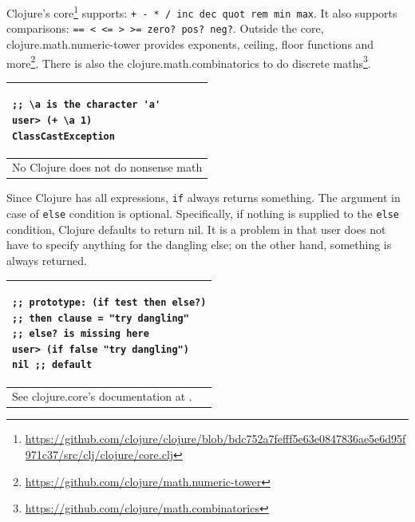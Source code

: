 \documentclass[12pt]{article}
\begin{document}

Clojure's core\footnote{\url{https://github.com/clojure/clojure/blob/bdc752a7fefff5e63e0847836ae5e6d95f971c37/src/clj/clojure/core.clj}} supports: \texttt{+ - * / inc dec quot rem min max}. It also supports comparisons: \texttt{== < <= > >= zero? pos? neg?}. Outside the core, clojure.math.numeric-tower provides exponents, ceiling, floor functions and more\footnote{\url{https://github.com/clojure/math.numeric-tower}}. There is also the clojure.math.combinatorics to do discrete maths\footnote{\url{https://github.com/clojure/math.combinatorics}}.


\begin{tabular}{|p{}|}
\hline
\begin{verbatim}
;; \a is the character 'a'
user> (+ \a 1)
ClassCastException 
\end{verbatim}
\\
\hline
No Clojure does not do nonsense math
\\
\hline
\end{tabular}


Since Clojure has all expressions, \texttt{if} always returns something. The argument in case of \texttt{else} condition is optional. Specifically, if nothing is supplied to the \texttt{else} condition, Clojure defaults to return nil. It is a problem in that user does not have to specify anything for the dangling else; on the other hand, something is always returned.


\begin{tabular}{|p{}|}
\hline
\begin{verbatim}
;; prototype: (if test then else?)
;; then clause = "try dangling"
;; else? is missing here
user> (if false "try dangling")
nil ;; default
\end{verbatim}
\\
\hline
See clojure.core's documentation at \cite{empty}.
\\
\hline
\end{tabular}


\end{document}
